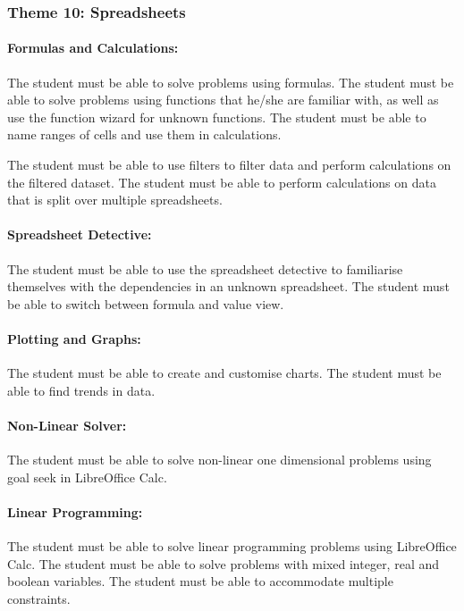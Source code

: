        \subsubsection{Theme 10: Spreadsheets}
            \paragraph{Formulas and Calculations:}
                The student must be able to solve problems using formulas. The
                student must be able to solve problems using functions that
                he/she are familiar with, as well as use the function wizard
                for unknown functions. The student must be able to name ranges
                of cells and use them in calculations.

                The student must be able to use filters to filter data and
                perform calculations on the filtered dataset. The student must
                be able to perform calculations on data that is split over
                multiple spreadsheets.

            \paragraph{Spreadsheet Detective:}
                The student must be able to use the spreadsheet detective to
                familiarise themselves with the dependencies in an unknown
                spreadsheet. The student must be able to switch between formula
                and value view.

            \paragraph{Plotting and Graphs:}
                The student must be able to create and customise charts. The
                student must be able to find trends in data.

            \paragraph{Non-Linear Solver:}
                The student must be able to solve non-linear one dimensional
                problems using goal seek in LibreOffice Calc.

            \paragraph{Linear Programming:}
                The student must be able to solve linear programming problems
                using LibreOffice Calc. The student must be able to solve
                problems with mixed integer, real and boolean variables. The
                student must be able to accommodate multiple constraints.

